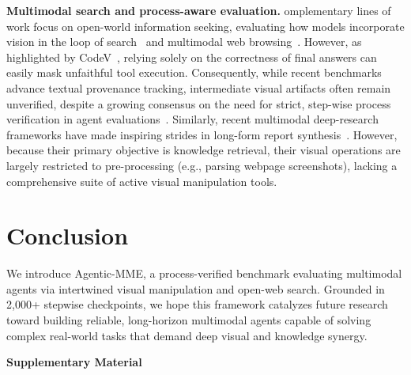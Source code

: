 \documentclass[runningheads]{llncs}
\theoremstyle{plain}
\theoremstyle{definition}
\theoremstyle{remark}
\begin{document}
\vspace{1mm}
\noindent\textbf{Multimodal search and process-aware evaluation.} omplementary lines of work focus on open-world information seeking, evaluating how models incorporate vision in the loop of search~\cite{jiang2024mmsearch,tao2025mmsearch} and multimodal web browsing~\cite{li2025mm}. However, as highlighted by CodeV~\cite{hou2025codev}, relying solely on the correctness of final answers can easily mask unfaithful tool execution. Consequently, while recent benchmarks advance textual provenance tracking, intermediate visual artifacts often remain unverified, despite a growing consensus on the need for strict, step-wise process verification in agent evaluations~\cite{froger2026gaia2,zhang2026adaptmmbench}. Similarly, recent multimodal deep-research frameworks have made inspiring strides in long-form report synthesis~\cite{huang2026vision,huang2026mmdeepresearch}. However, because their primary objective is knowledge retrieval, their visual operations are largely restricted to pre-processing (e.g., parsing webpage screenshots), lacking a comprehensive suite of active visual manipulation tools.

\section{Conclusion}
\vspace{-2mm}
We introduce Agentic-MME, a process-verified benchmark evaluating multimodal agents via intertwined visual manipulation and open-web search. Grounded in 2,000+ stepwise checkpoints, we hope this framework catalyzes future research toward building reliable, long-horizon multimodal agents capable of solving complex real-world tasks that demand deep visual and knowledge synergy.
\clearpage  %


%
%


\clearpage
\appendix
\renewcommand{\theHsection}{\Alph{section}}
\renewcommand{\theHtable}{\Alph{section}.\arabic{table}}
\renewcommand{\theHfigure}{\Alph{section}.\arabic{figure}}
\begin{center}
    \Large\bfseries Supplementary Material
\end{center}
\vspace{1em}
\end{document}
